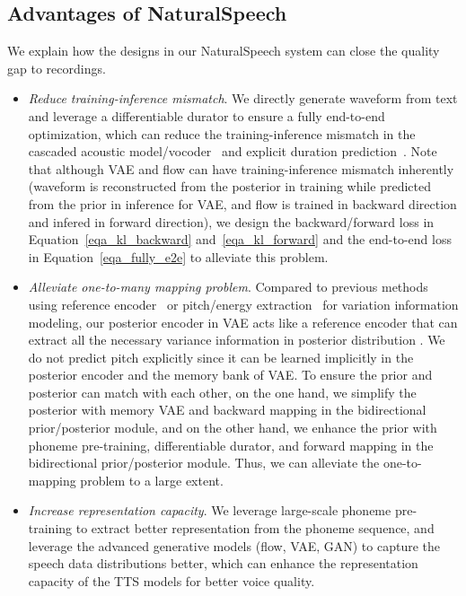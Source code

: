 \documentclass{article}
\theoremstyle{definition}
\def\myname{NaturalSpeech}
\begin{document}
\subsection{Advantages of \myname{}}
\label{sec_why_can_close}

We explain how the designs in our \myname{} system can close the quality gap to recordings.

\begin{itemize}[leftmargin=*]
\item \textit{Reduce training-inference mismatch}. We directly generate waveform from text and leverage a differentiable durator to ensure a fully end-to-end optimization, which can reduce the training-inference mismatch in the cascaded acoustic model/vocoder~\citep{kim2020glow,ren2021fastspeech,popov2021grad,elias2021parallel} and explicit duration prediction~\citep{kim2021conditional,kim2020glow,ren2021fastspeech}. Note that although VAE and flow can have training-inference mismatch inherently (waveform is reconstructed from the posterior in training while predicted from the prior in inference for VAE, and flow is trained in backward direction and infered in forward direction), we design the backward/forward loss in Equation~\ref{eqa_kl_backward} and~\ref{eqa_kl_forward} and the end-to-end loss in Equation~\ref{eqa_fully_e2e} to alleviate this problem.  

\item \textit{Alleviate one-to-many mapping problem}. Compared to previous methods using reference encoder~\citep{wang2018style,chen2021adaspeech,wu2022adaspeech,liu2021delightfultts} or pitch/energy extraction~\citep{ren2021fastspeech} for variation information modeling, our posterior encoder  in VAE acts like a reference encoder that can extract all the necessary variance information in posterior distribution . We do not predict pitch explicitly since it can be learned implicitly in the posterior encoder and the memory bank of VAE. To ensure the prior and posterior can match with each other, on the one hand, we simplify the posterior with memory VAE and backward mapping in the bidirectional prior/posterior module, and on the other hand, we enhance the prior with phoneme pre-training, differentiable durator, and forward mapping in the bidirectional prior/posterior module. Thus, we can alleviate the one-to-mapping problem to a large extent. 

\item \textit{Increase representation capacity}. We leverage large-scale phoneme pre-training to extract better representation from the phoneme sequence, and leverage the advanced generative models (flow, VAE, GAN) to capture the speech data distributions better, which can enhance the representation capacity of the TTS models for better voice quality. 

\end{itemize}
\end{document}
